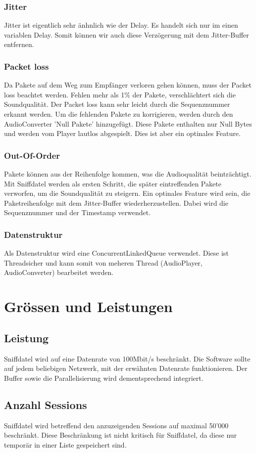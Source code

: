 \documentclass[a4,12pt]{scrartcl}
\begin{document}
\subsubsection{Jitter}
Jitter ist eigentlich sehr änhnlich wie der Delay. Es handelt sich nur im einen variablen Delay. Somit können wir auch diese Verzögerung mit dem Jitter-Buffer entfernen.
\subsubsection{Packet loss}
Da Pakete auf dem Weg zum Empfänger verloren gehen können, muss der Packet loss beachtet werden. Fehlen mehr als 1\% der Pakete, verschlächtert sich die Soundqualität.
Der Packet loss kann sehr leicht durch die Sequenznummer erkannt werden.
Um die fehlenden Pakete zu korrigieren, werden durch den AudioConverter 'Null Pakete' hinzugefügt. Diese Pakete enthalten nur Null Bytes und werden vom Player lautlos abgespielt.
Dies ist aber ein optinales Feature.
\subsubsection{Out-Of-Order}
Pakete können aus der Reihenfolge kommen, was die Audioqualität beinträchtigt.
Mit Sniffdatel werden als ersten Schritt, die später eintreffenden Pakete verworfen, um die Soundqualität zu steigern. Ein optinales Feature wird sein, die Paketreihenfolge mit dem Jitter-Buffer wiederherzustellen. Dabei wird die Sequenznummer und der Timestamp verwendet.
\subsubsection{Datenstruktur}
Als Datenstruktur wird eine ConcurrentLinkedQueue verwendet. Diese ist Threadsicher und kann somit von meheren Thread (AudioPlayer, AudioConverter) bearbeitet werden. 

\section{Grössen und Leistungen}
\subsection{Leistung}
Sniffdatel wird auf eine Datenrate von 100Mbit/s beschränkt. Die Software sollte auf jedem beliebigen Netzwerk, mit der erwähnten Datenrate funktionieren. Der Buffer sowie die Parallelisierung wird dementsprechend integriert. 
\subsection{Anzahl Sessions}
Sniffdatel wird betreffend den anzuzeigenden Sessions auf maximal 50’000 beschränkt. Diese Beschränkung ist nicht kritisch für Sniffdatel, da diese nur temporär in einer Liste gespeichert sind.
\end{document}
